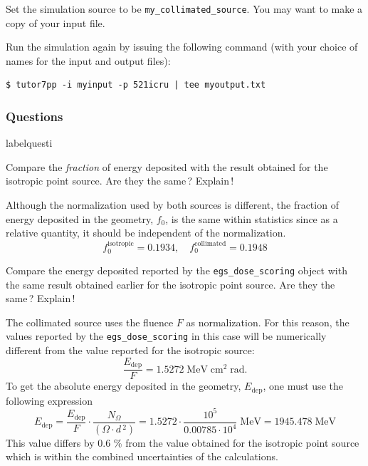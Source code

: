 \documentclass[12pt,twoside]{article}
\makeatletter
\renewcommand\thequesti         {\@arabic\c@questi}
\newenvironment{question}{
    \bfseries
    \edef\@questictr{questi}
    \expandafter
    \list \csname label\@questictr\endcsname {
        \usecounter\@questictr\def\makelabel##1{\hss\llap{##1}}
        \savebox{\questbox}             {\thequesti}
        \setlength\labelsep             {0.6em}
        \setlength\labelwidth           {\wd\questbox}
        \setlength\leftmargini          {\labelwidth}
        \addtolength{\leftmargini}      {\labelsep}
        \addtolength{\leftmargini}      {0.2em}
        \leftmargin\leftmargini
        \setlength\topsep               {1em}
        \setlength\itemsep              {1.2em}
        \setlength\parsep               {0.5em}
    }
}{\normalfont\endlist}
\newenvironment{answer}{\normalfont}{\relax}
\makeatother
\begin{document}
Set the simulation source to be \Verb+my_collimated_source+. You may want
to make a copy of your input file.

Run the simulation again by issuing the following command (with your choice of names for the input and output files):

\begin{lstlisting}
$ tutor7pp -i myinput -p 521icru | tee myoutput.txt
\end{lstlisting}


\subsubsection{Questions}

\begin{question}
\item Compare the \textit{fraction} of energy deposited with the result
obtained for the isotropic point source.
Are they the same\,? Explain\,!

\begin{answer}
Although the normalization used by both sources is different, the
fraction of energy deposited in the geometry, $f_0$, is the same within
statistics since as a relative quantity, it should be independent of the
normalization.
\begin{equation*}
 f_0^\mathrm{isotropic} = 0.1934 ,\quad f_0^\mathrm{collimated} = 0.1948
\end{equation*}
\end{answer}

\vspace{-2em}
\item Compare the energy deposited reported by the \Verb+egs_dose_scoring+
object with the same result obtained earlier for the isotropic point source.
Are they the same\,? Explain\,!

\begin{answer}
The collimated source uses the fluence $F$ as normalization. For this reason, the
values reported by the \Verb+egs_dose_scoring+ in this case will be numerically
different from the value reported for the isotropic source:
\begin{equation*}
\frac{E_\mathrm{dep}}{F} = 1.5272\;\mathrm{MeV\; cm^2\;rad.}
\end{equation*}
To get the absolute energy deposited in the geometry, $E_\mathrm{dep}$, one
must use the following expression
\begin{equation*}
E_\mathrm{dep} = \frac{E_\mathrm{dep}}{F} \cdot \frac{N_{\Omega}}{(\Omega
\cdot d\,^2)} = 1.5272 \cdot \frac{10^5}{0.00785 \cdot 10^4} \;\mathrm{MeV}
= 1945.478 \;\mathrm{MeV}
\end{equation*}
This value differs by 0.6 \% from the value obtained for the isotropic
point source which is within the combined uncertainties of the calculations.


\end{answer}
\end{question}
\end{document}
